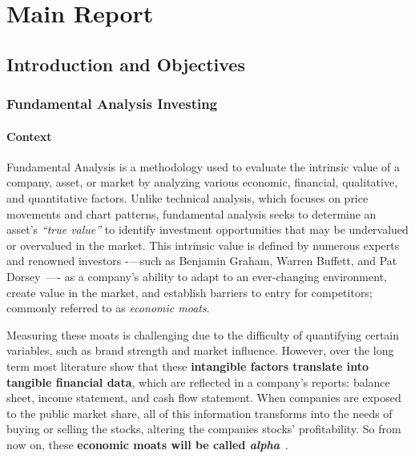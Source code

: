\documentclass[11pt,english,a4paper,hidelinks]{book}
\begin{document}
\listoftables


\printglossary[type=\acronymtype, title=Acronyms and Abbreviations]

\clearpage
{}
\setcounter{page}{1}

\part{Main Report}

\chapter{Introduction and Objectives }
\section{Fundamental Analysis Investing}

\subsection{Context}

\noindent Fundamental Analysis is a methodology used to evaluate the intrinsic value of a company, asset, or market by analyzing various economic, financial, qualitative, and quantitative factors. Unlike technical analysis, which focuses on price movements and chart patterns, fundamental analysis seeks to determine an asset's \textit{``true value''} to identify investment opportunities that may be undervalued or overvalued in the market. This intrinsic value is defined by numerous experts and renowned investors -—such as Benjamin Graham, Warren Buffett, and Pat Dorsey~\cite{dorsey2011five}—- as a company's ability to adapt to an ever-changing environment, create value in the market, and establish barriers to entry for competitors; commonly referred to as \textit{economic moats}.

\vspace{0.5cm}
\noindent Measuring these moats is challenging due to the difficulty of quantifying certain variables, such as brand strength and market influence. However, over the long term most literature show that these \textbf{intangible factors translate into tangible financial data}, which are reflected in a company's reports: balance sheet, income statement, and cash flow statement. When companies are exposed to the public market share, all of this information transforms into the needs of buying or selling the stocks, altering the companies stocks' profitability. So from now on, these \textbf{economic moats will be called \textit{alpha}}~\cite{sharpe1964capm}.
\end{document}
